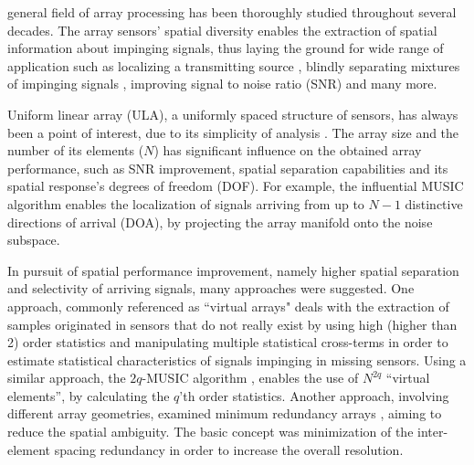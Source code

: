 general field of array processing has been thoroughly studied throughout several decades.
The array sensors' spatial diversity enables the extraction of spatial information about impinging signals, thus laying the ground for wide range of application such as localizing a transmitting source \cite{skolnik2008radar}, blindly separating mixtures of impinging signals \cite{comon1994independent}, improving signal to noise ratio (SNR) \cite{verdu1998multiuser} and many more. 
\par Uniform linear array (ULA), a uniformly spaced structure of sensors, has always been a point of interest, due to its simplicity of analysis \cite{van2004optimum}. 
The array size and the number of its elements ($N$) has significant influence on the obtained array performance, such as SNR improvement, spatial separation capabilities and its spatial response's degrees of freedom (DOF). For example, the influential MUSIC algorithm \cite{schmidt1986multiple} enables the localization of signals arriving from up to $N-1$ distinctive directions of arrival (DOA), by projecting the array manifold onto the noise subspace.
\par In pursuit of spatial performance improvement, namely higher spatial separation and selectivity of arriving signals, many approaches were suggested.  
One approach, commonly referenced as ``virtual arrays" \cite{pal2010nested,chevalier2005virtual,dogan1995applications} deals with the extraction of samples originated in sensors that do not really exist by using high (higher than 2) order statistics and manipulating multiple statistical cross-terms in order to estimate statistical characteristics of signals impinging in missing sensors.
Using a similar approach, the $2q$-MUSIC algorithm \cite{chevalier2006high}, enables the use of $N^{2q}$ ``virtual elements'', by calculating the $q$'th order statistics.
Another approach, involving different array geometries, examined minimum redundancy arrays \cite{moffet1968minimum,pillai1985new,pillai1987statistical}, aiming to reduce the spatial ambiguity. The basic concept was minimization of the inter-element spacing redundancy in order to increase the overall resolution. 

